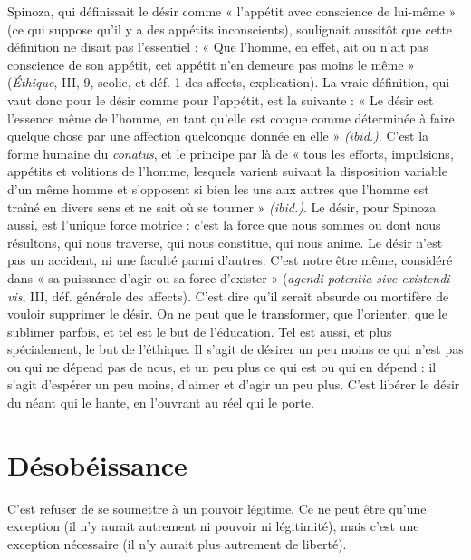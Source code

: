 Spinoza, qui définissait le désir comme « l’appétit avec conscience de lui-même »
(ce qui suppose qu’il y a des appétits inconscients), soulignait aussitôt
que cette définition ne disait pas l’essentiel : « Que l’homme, en effet, ait ou
n'ait pas conscience de son appétit, cet appétit n’en demeure pas moins le
même » ({\it Éthique}, III, 9, scolie, et déf. 1 des affects, explication). La vraie définition,
qui vaut donc pour le désir comme pour l'appétit, est la suivante : « Le
désir est l’essence même de l’homme, en tant qu’elle est conçue comme déterminée
à faire quelque chose par une affection quelconque donnée en elle »
{\it (ibid.)}. C’est la forme humaine du {\it conatus}, et le principe par là de « tous les
efforts, impulsions, appétits et volitions de l’homme, lesquels varient suivant la
disposition variable d’un même homme et s’opposent si bien les uns aux autres
que l’homme est traîné en divers sens et ne sait où se tourner » {\it (ibid.)}. Le désir,
pour Spinoza aussi, est l’unique force motrice : c’est la force que nous sommes
ou dont nous résultons, qui nous traverse, qui nous constitue, qui nous anime.
Le désir n’est pas un accident, ni une faculté parmi d’autres. C’est notre être
même, considéré dans « sa puissance d’agir ou sa force d'exister » ({\it agendi
potentia sive existendi vis}, III, déf. générale des affects). C’est dire qu'il serait
absurde ou mortifère de vouloir supprimer le désir. On ne peut que le transformer,
que l’orienter, que le sublimer parfois, et tel est le but de l’éducation.
Tel est aussi, et plus spécialement, le but de l’éthique. Il s’agit de désirer un peu
moins ce qui n’est pas ou qui ne dépend pas de nous, et un peu plus ce qui est
ou qui en dépend : il s’agit d’espérer un peu moins, d’aimer et d’agir un peu
plus. C’est libérer le désir du néant qui le hante, en l’ouvrant au réel qui le
porte.

\section{Désobéissance}
C’est refuser de se soumettre à un pouvoir légitime. Ce
ne peut être qu’une exception (il n’y aurait autrement
ni pouvoir ni légitimité), mais c’est une exception nécessaire (il n’y aurait plus
autrement de liberté).

